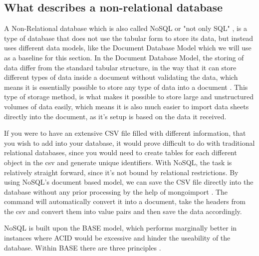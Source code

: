 \subsection{What describes a non-relational database}
\label{sec:what-describes-a-non-relational-database}
A Non-Relational database which is also called NoSQL or "not only SQL" \parencite{mongodb-what-is-nosql}, is a type of database that does not use the tabular form to store its data, but instead uses different data models, like the Document Database Model which we will use as a baseline for this section.
In the Document Database Model, the storing of data differ from the standard tabular structure, in the way that it can store different types of data inside a document without validating the data, which means it is essentially possible to store any type of data into a document \parencite{mongodb-non-relational-database}.
This type of storage method, is what makes it possible to store large and unstructured volumes of data easily, which means it is also much easier to import data sheets directly into the document, as it's setup is based on the data it received.

If you were to have an extensive CSV file filled with different information, that you wish to add into your database, it would prove difficult to do with traditional relational databases, since you would need to create tables for each different object in the csv and generate unique identifiers.
With NoSQL, the task is relatively straight forward, since it's not bound by relational restrictions. By using NoSQL's document based model, we can save the CSV file directly into the database without any prior processing by the help of mongoimport \parencite{mongo-csv}. The command will automatically convert it into a document, take the headers from the csv and convert them into value pairs and then save the data accordingly. 

NoSQL is built upon the BASE model, which performs marginally better in instances where ACID would be excessive and hinder the useability of the database. Within BASE there are three principles \parencite{lifewire-base}.  

